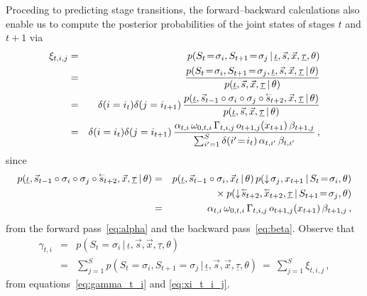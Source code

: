 \documentclass[a4paper]{article}
\newcommand{\rvec}[1]{\accentset{\leftarrow}{#1}}
\newcommand{\dn}{\downarrow\!}
\begin{document}
Proceding to predicting stage transitions, 
the forward--backward calculations also enable us to compute the posterior probabilities of the joint states of stages $t$ and $t+1$ via
\begin{eqnarray}
\xi_{t,i,j} & = &
   p(S_t\!=\!\sigma_i,S_{t+1}\!=\!\sigma_j\,|\,\underline{\iota},\vec{s},\vec{x},\underline{\tau},\theta)
\nonumber\\& = & 
   \frac{p(S_t\!=\!\sigma_i,S_{t+1}\!=\!\sigma_j,\underline{\iota},\vec{s},\vec{x},\underline{\tau}\,|\,\theta)}
        {p(\underline{\iota},\vec{s},\vec{x},\underline{\tau}\,|\,\theta)}
\nonumber\\& = & 
\delta(i=i_{t})\delta(j=i_{t+1})\,
   \frac{p(\underline{\iota},\vec{s}_{t-1}\circ\sigma_{i}\circ\sigma_{j}\circ\rvec{s}_{t+2},\vec{x},\underline{\tau}\,|\,\theta)}
        {p(\underline{\iota},\vec{s},\vec{x},\underline{\tau}\,|\,\theta)}
\nonumber\\& = & 
\delta(i=i_{t})\delta(j=i_{t+1})\,\frac{\alpha_{t,i}\,\omega_{0,t,i}\,\Gamma_{t,i,j}\,o_{t+1,j}(x_{t+1})\,\beta_{t+1,j}}
{\sum_{i'=1}^S\delta(i'\!=\!i_t)\,\alpha_{t,i'}\,\beta_{t,i'}}\,,
\label{eq:xi_t_i_j}
\end{eqnarray}
since
\begin{eqnarray}
p(\underline{\iota},\vec{s}_{t-1}\circ\sigma_{i}\circ\sigma_{j}\circ\rvec{s}_{t+2},\vec{x},\underline{\tau}\,|\,\theta)
& = &
p(\underline{\iota},\vec{s}_{t-1}\circ\sigma_{i},\vec{x}_t\,|\,\theta)\,p(\dn\sigma_j,x_{t+1}\,|\,S_{t}\!=\!\sigma_i,\theta)
\nonumber\\&&{}\times
p(\dn\rvec{s}_{t+2},\rvec{x}_{t+2},\underline{\tau}\,|\,S_{t+1}\!=\!\sigma_j,\theta)
\nonumber\\& = &
\alpha_{t,i}\,\omega_{0,t,i}\,\Gamma_{t,i,j}\,o_{t+1,j}(x_{t+1})\,\beta_{t+1,j}\,,
\end{eqnarray}
from the forward pass~\eqref{eq:alpha} and the backward pass~\eqref{eq:beta}.
Observe that
\begin{eqnarray}
   \gamma_{t,i} & = & p(S_t\!=\!\sigma_i\,|\,\underline{\iota},\vec{s},\vec{x},\underline{\tau},\theta)
\nonumber\\& = &
\sum_{j=1}^{S}p(S_t\!=\!\sigma_i,S_{t+1}\!=\!\sigma_j\,|\,\underline{\iota},\vec{s},\vec{x},\underline{\tau},\theta)
~=~\sum_{j=1}^{S}\xi_{t,i,j}\,,
\label{eq:xi_to_gamma}
\end{eqnarray}
from equations~\eqref{eq:gamma_t_i} and \eqref{eq:xi_t_i_j}.
\end{document}
